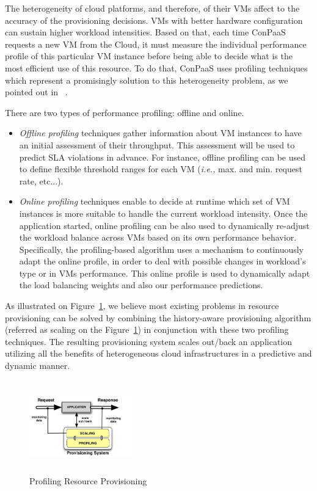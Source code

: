 The heterogeneity of cloud platforms, and therefore, of their VMs affect to the accuracy of the provisioning decisions. VMs with better hardware configuration can sustain higher workload intensities. Based on that, each time ConPaaS requests a new VM from the Cloud, it must measure the individual performance profile of this particular VM instance before being able to decide what is the most efficient use of this resource. To do that, ConPaaS uses profiling techniques which represent a promisingly solution to this heterogeneity problem,  as we pointed out in ~\cite{jiangThesis}. 

\noindent There are two types of performance profiling: offline and online.

\begin{itemize}
\item \emph{Offline profiling} techniques gather information about VM instances to have an initial assessment of their throughput. This assessment will be used to predict SLA violations in advance. For instance, offline profiling can be used to define flexible threshold ranges for each VM (\emph{i.e.,} max. and min. request rate, etc...).

\item \emph{Online profiling} techniques enable to decide at runtime which set of VM instances is more suitable to handle the current workload intensity. Once the application started, online profiling can be also used to dynamically re-adjust the workload balance across VMs based on its own performance behavior. Specifically,  the profiling-based algorithm uses a mechanism to continuously adapt the online profile, in order to deal with possible changes in workload's type or in VMs performance. This online profile is used to dynamically adapt the load balancing weights and also our performance predictions. 

\end{itemize}

As illustrated on Figure~\ref{model}, we believe most existing problems in resource provisioning can be solved by combining the history-aware provisioning algorithm (referred as scaling on the Figure~\ref{model}) in conjunction with these two profiling techniques. The resulting provisioning system scales out/back an application utilizing all the benefits of heterogeneous cloud infrastructures in a predictive and dynamic manner.



\begin{figure}
\begin{center}
\includegraphics[width=0.4\textwidth, height=4cm]{./images/monitoringSchema.jpg}
\end{center}
\label{model}
\caption{Profiling Resource Provisioning}
\end{figure}
